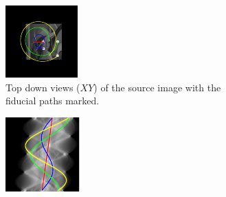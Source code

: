 \begin{figure}
  \centering
  \hfill
  \begin{subfigure}[t]{0.3\textwidth}
    \includegraphics[width=\textwidth]{Chapters/flopt/Figs/PDF/results/helix/topdown_bead_paths}
    \caption{Top down views ($XY$) of the source image with the fiducial paths marked.}
    \label{fig:topdown_bead_paths}
  \end{subfigure}\hfill
  \begin{subfigure}[t]{0.3\textwidth}
    \includegraphics[width=\textwidth]{Chapters/flopt/Figs/PDF/results/helix/sinugram_stretch}

\end{subfigure}
\end{figure}
